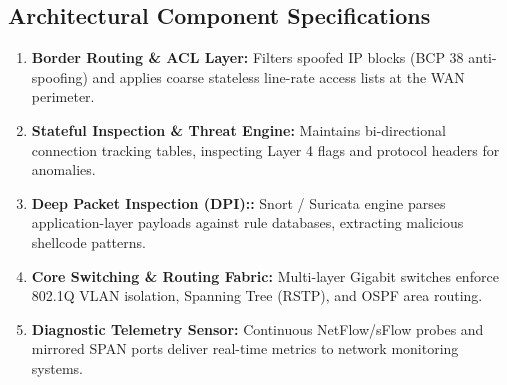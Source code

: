 \subsection{Architectural Component Specifications}
\begin{enumerate}
  \item \textbf{Border Routing \& ACL Layer:} Filters spoofed IP blocks (BCP 38 anti-spoofing) and applies coarse stateless line-rate access lists at the WAN perimeter.
  \item \textbf{Stateful Inspection \& Threat Engine:} Maintains bi-directional connection tracking tables, inspecting Layer 4 flags and protocol headers for anomalies.
  \item \textbf{Deep Packet Inspection (DPI)::} Snort / Suricata engine parses application-layer payloads against rule databases, extracting malicious shellcode patterns.
  \item \textbf{Core Switching \& Routing Fabric:} Multi-layer Gigabit switches enforce 802.1Q VLAN isolation, Spanning Tree (RSTP), and OSPF area routing.
  \item \textbf{Diagnostic Telemetry Sensor:} Continuous NetFlow/sFlow probes and mirrored SPAN ports deliver real-time metrics to network monitoring systems.
\end{enumerate}
